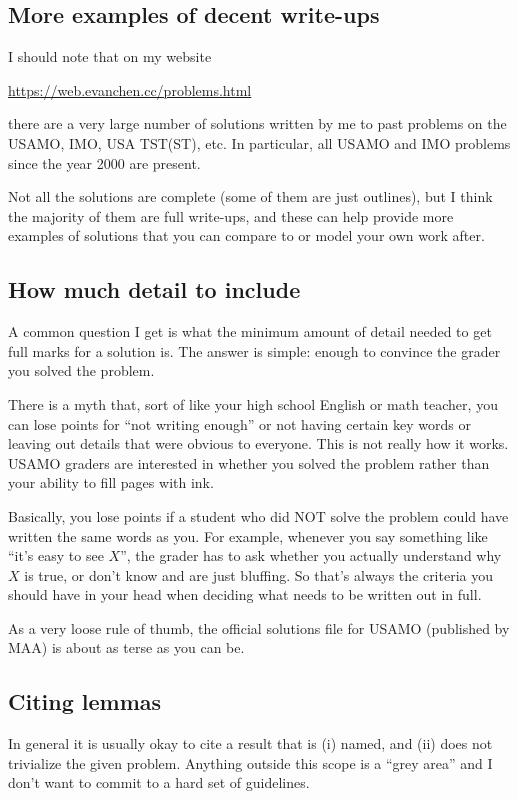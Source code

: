\subsection{More examples of decent write-ups}
I should note that on my website
\begin{center}
	\url{https://web.evanchen.cc/problems.html}
\end{center}
there are a very large number of solutions written by me
to past problems on the USAMO, IMO, USA TST(ST), etc.
In particular, all USAMO and IMO problems since the year 2000
are present.

Not all the solutions are complete
(some of them are just outlines),
but I think the majority of them are full write-ups,
and these can help provide more examples of solutions
that you can compare to or model your own work after.

\subsection{How much detail to include}
A common question I get is what the minimum amount of detail needed
to get full marks for a solution is.
The answer is simple: enough to convince the grader you solved the problem.

There is a myth that, sort of like your high school English or math teacher,
you can lose points for ``not writing enough'' or not having certain key words
or leaving out details that were obvious to everyone.
This is not really how it works.
USAMO graders are interested in whether you solved the problem
rather than your ability to fill pages with ink.

Basically, \alert{you lose points if a student who did NOT solve the problem
could have written the same words as you}.
For example, whenever you say something like ``it's easy to see $X$'',
the grader has to ask whether you actually understand why $X$ is true,
or don't know and are just bluffing.
So that's always the criteria you should have in your head
when deciding what needs to be written out in full.

As a very loose rule of thumb,
the official solutions file for USAMO (published by MAA)
is about as terse as you can be.

\subsection{Citing lemmas}
In general it is usually okay to cite a result that is
(i) named, and (ii) does not trivialize the given problem.
Anything outside this scope is a ``grey area''
and I don't want to commit to a hard set of guidelines.

